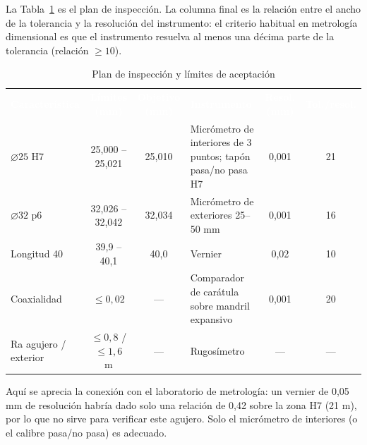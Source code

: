 \documentclass[12pt,a4paper]{article}
\newcommand{\encab}[1]{\textcolor{white}{\sffamily\bfseries #1}}
\begin{document}
La Tabla~\ref{tab:inspeccion} es el plan de inspección. La columna final es la
relación entre el ancho de la tolerancia y la resolución del instrumento: el
criterio habitual en metrología dimensional es que el instrumento resuelva al
menos una décima parte de la tolerancia (relación $\ge10$).

\begin{table}[!htb]
	\centering
	\caption{Plan de inspección y límites de aceptación}\label{tab:inspeccion}
	\footnotesize
	\setlength{\tabcolsep}{3pt}
	\begin{tabularx}{\linewidth}{>{\raggedright\arraybackslash}p{2.1cm} c c >{\raggedright\arraybackslash}X c c}
		\rowcolor{darkblue}
		\encab{Característica}                                      & \encab{Límites (mm)}              & \encab{Objetivo (mm)} & \encab{Instrumento}                            & \encab{Resol. (mm)} & \encab{Tol./resol.} \\
		$\varnothing25$ H7                                          & 25,000 -- 25,021                  & 25,010                &
		Micrómetro de interiores de 3 puntos; tapón pasa/no pasa H7 & 0,001                             & 21                                                                                                                 \\
		$\varnothing32$ p6                                          & 32,026 -- 32,042                  & 32,034                & Micrómetro de exteriores 25--50 mm             & 0,001               & 16                  \\
		Longitud 40                                                 & 39,9 -- 40,1                      & 40,0                  & Vernier                                        & 0,02                & 10                  \\
		Coaxialidad                                                 & $\le0{,}02$                       & ---                   & Comparador de carátula sobre mandril expansivo & 0,001               & 20                  \\
		Ra agujero / exterior                                       & $\le0{,}8$ / $\le1{,}6$ \textmu m & ---                   & Rugosímetro                                    & ---                 & ---                 \\
	\end{tabularx}
\end{table}

Aquí se aprecia la conexión con el laboratorio de metrología: un vernier de
0,05 mm de resolución habría dado solo una relación de 0,42 sobre la zona H7
(21 \textmu m), por lo que no sirve para verificar este agujero. Solo el
micrómetro de interiores (o el calibre pasa/no pasa) es adecuado.
\end{document}

